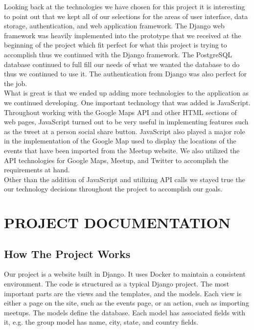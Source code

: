 \documentclass[draftclsnofoot,10pt,onecolumn]{IEEEtran} %
\begin{document}
Looking back at the technologies we have chosen for this project it is interesting to point out that we kept all of our selections 
for the areas of user interface, data storage, authentication, and web application framework. The Django web framework was 
heavily implemented into the prototype that we received at the beginning of the project which fit perfect for what this project 
is trying to accomplish thus we continued with the Django framework. The PostgreSQL database continued to full fill our needs of 
what we wanted the database to do thus we continued to use it. The authentication from Django was also perfect for the job. \\

What is great is that we ended up adding more technologies to the application as we continued developing. One important 
technology that was added is JavaScript. Throughout working with the Google Maps API and other HTML sections of web pages, 
JavaScript turned out to be very useful in implementing features such as the tweet at a person social share button. JavaScript 
also played a major role in the implementation of the Google Map used to display the locations of the events that have been 
imported from the Meetup website. We also utilized the API technologies for Google Maps, Meetup, and Twitter to accomplish 
the requirements at hand. \\

Other than the addition of JavaScript and utilizing API calls we stayed true the our technology decisions throughout the project 
to accomplish our goals. \\







\section{PROJECT DOCUMENTATION}

\subsection{How The Project Works}
Our project is a website built in Django. It uses Docker to maintain a
consistent environment. The code is structured as a typical Django project. The
most important parts are the views and the templates, and the models. Each view
is either a page on the site, such as the events page, or an action, such as
importing meetups. The models define the database. Each model has associated
fields with it, e.g. the group model has name, city, state, and country fields.\\
\end{document}
